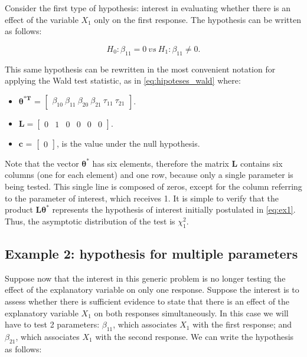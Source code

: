 \documentclass[AMA,STIX1COL]{WileyNJD-v2}
\begin{document}
Consider the first type of hypothesis: interest in evaluating whether there is an effect of the variable $X_1$ only on the first response. The hypothesis can be written as follows:

\begin{equation}
\label{eq:ex1}
H_0: \beta_{11} = 0 \ vs \ H_1: \beta_{11} \neq 0.
\end{equation}

This same hypothesis can be rewritten in the most convenient notation for applying the Wald test statistic, as in \autoref{eq:hipoteses_wald} where:

\begin{itemize}
  
  \item $\boldsymbol{\theta^{*T}}$ = $\begin{bmatrix} \beta_{10} \  \beta_{11} \ \beta_{20} \ \beta_{21} \ \tau_{11} \ \tau_{21} \end{bmatrix}$.

\item $\boldsymbol{L} = \begin{bmatrix} 0 & 1 & 0 & 0 & 0 & 0  \end{bmatrix}.$
 
\item $\boldsymbol{c}$ = $\begin{bmatrix} 0 \end{bmatrix}$, is the value under the null hypothesis. 
\end{itemize}

Note that the vector $\boldsymbol{\theta^{*}}$ has six elements, therefore the matrix $\boldsymbol{L}$ contains six columns (one for each element) and one row, because only a single parameter is being tested. This single line is composed of zeros, except for the column referring to the parameter of interest, which receives 1. It is simple to verify that the product $\boldsymbol{L}\boldsymbol{\theta^{*}}$ represents the hypothesis of interest initially postulated in \autoref{eq:ex1}. Thus, the asymptotic distribution of the test is $\chi^2_1$.

\subsection{Example 2: hypothesis for multiple parameters}\label{sec:ex2}

Suppose now that the interest in this generic problem is no longer testing the effect of the explanatory variable on only one response. Suppose the interest is to assess whether there is sufficient evidence to state that there is an effect of the explanatory variable $X_1$ on both responses simultaneously. In this case we will have to test 2 parameters: $\beta_{11}$, which associates $X_1$ with the first response; and $\beta_{21}$, which associates $X_1$ with the second response. We can write the hypothesis as follows:
\end{document}
